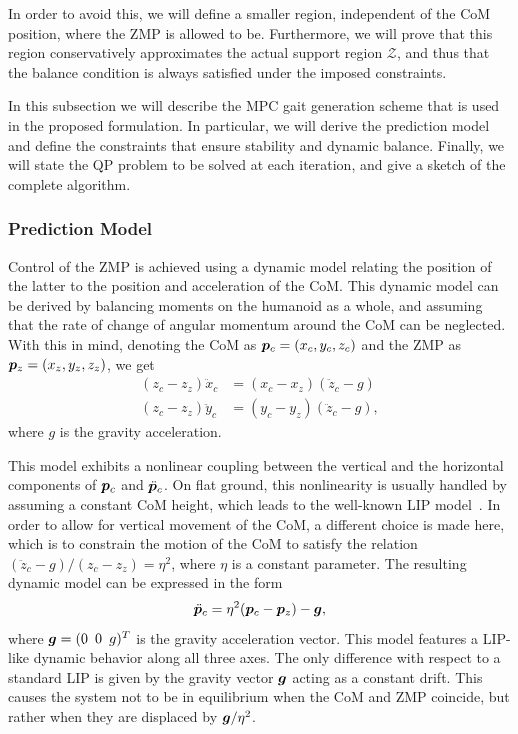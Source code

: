 In order to avoid this, we will define a smaller region, independent of the CoM position, where the ZMP is allowed to be. Furthermore, we will prove that this region conservatively approximates the actual support region $\mathcal{Z}$, and thus that the balance condition is always satisfied under the imposed constraints.

In this subsection we will describe the MPC gait generation scheme that is used in the proposed formulation. In particular, we will derive the prediction model and define the constraints that ensure stability and dynamic balance. Finally, we will state the QP problem to be solved at each iteration, and give a sketch of the complete algorithm.

\smallskip

\subsubsection{Prediction Model}

Control of the ZMP is achieved using a dynamic model relating the position of the latter to the position and acceleration of the CoM. This dynamic model can be derived by balancing moments on the humanoid as a whole, and assuming that the rate of change of angular momentum around the CoM can be neglected. With this in mind, denoting the CoM as ${\bm{p}}_c = (x_c, y_c, z_c)$ and the ZMP as ${\bm{p}}_z = (x_z, y_z, z_z)$, we get
\begin{equation}\begin{split}
(z_c - z_z)\ddot x_c &= (x_c - x_z)(\ddot z_c - g) \\
(z_c - z_z)\ddot y_c &= (y_c - y_z)(\ddot z_c - g),
\end{split}\end{equation}
where $g$ is the gravity acceleration.

This model exhibits a nonlinear coupling between the vertical and the horizontal components of ${\bm{p}}_c$ and $\ddot{{\bm{p}}}_c$. On flat ground, this nonlinearity is usually handled by assuming a constant CoM height, which leads to the well-known LIP model~\cite{KaKaKaFuHaYoHi:03}. In order to allow for vertical movement of the CoM, a different choice is made here, which is to constrain the motion of the CoM to satisfy the relation $(\ddot z_c - g)/(z_c - z_z) = \eta^2$, where $\eta$ is a constant parameter.
The resulting dynamic model can be expressed in the form
\begin{equation}\label{eq:3dmodel}
\ddot {{\bm{p}}}_c = \eta^2({\bm{p}}_c - {\bm{p}}_z) - {\bm{g}},
\end{equation}
where ${\bm{g}} = (0\,\,\,0\,\,\,g)^T$ is the gravity acceleration vector. This model features a LIP-like dynamic behavior along all three axes. The only difference with respect to a standard LIP is given by the gravity vector ${\bm{g}}$ acting as a constant drift. This causes the system not to be in equilibrium when the CoM and ZMP coincide, but rather when they are displaced by ${\bm{g}}/\eta^2$.

